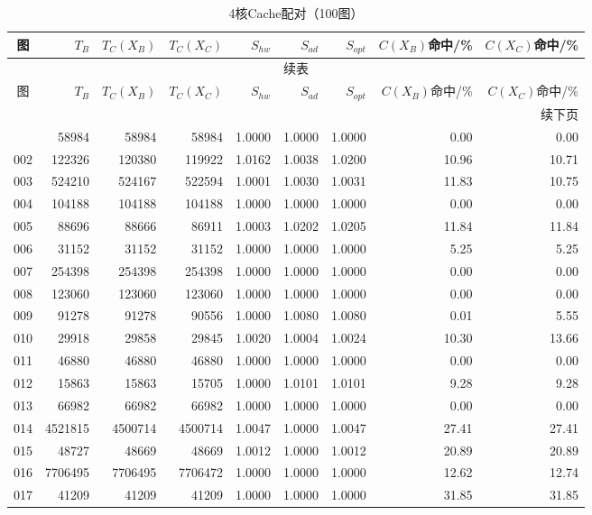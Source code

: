 \begin{longtable}{crrrrrrrr}
\caption{4核Cache配对（100图）}\label{tab:cache-detail-4}\\
\toprule
图 & $T_B$ & $T_C(X_B)$ & $T_C(X_C)$ & $S_{hw}$ & $S_{ad}$ & $S_{opt}$ & $C(X_B)$命中/\% & $C(X_C)$命中/\% \\
\midrule
\endfirsthead
\multicolumn{9}{c}{续表}\\
\toprule
图 & $T_B$ & $T_C(X_B)$ & $T_C(X_C)$ & $S_{hw}$ & $S_{ad}$ & $S_{opt}$ & $C(X_B)$命中/\% & $C(X_C)$命中/\% \\
\midrule
\endhead
\midrule\multicolumn{9}{r}{续下页}\\
\endfoot
\bottomrule
\endlastfoot
001 & 58984 & 58984 & 58984 & 1.0000 & 1.0000 & 1.0000 & 0.00 & 0.00 \\
002 & 122326 & 120380 & 119922 & 1.0162 & 1.0038 & 1.0200 & 10.96 & 10.71 \\
003 & 524210 & 524167 & 522594 & 1.0001 & 1.0030 & 1.0031 & 11.83 & 10.75 \\
004 & 104188 & 104188 & 104188 & 1.0000 & 1.0000 & 1.0000 & 0.00 & 0.00 \\
005 & 88696 & 88666 & 86911 & 1.0003 & 1.0202 & 1.0205 & 11.84 & 11.84 \\
006 & 31152 & 31152 & 31152 & 1.0000 & 1.0000 & 1.0000 & 5.25 & 5.25 \\
007 & 254398 & 254398 & 254398 & 1.0000 & 1.0000 & 1.0000 & 0.00 & 0.00 \\
008 & 123060 & 123060 & 123060 & 1.0000 & 1.0000 & 1.0000 & 0.00 & 0.00 \\
009 & 91278 & 91278 & 90556 & 1.0000 & 1.0080 & 1.0080 & 0.01 & 5.55 \\
010 & 29918 & 29858 & 29845 & 1.0020 & 1.0004 & 1.0024 & 10.30 & 13.66 \\
011 & 46880 & 46880 & 46880 & 1.0000 & 1.0000 & 1.0000 & 0.00 & 0.00 \\
012 & 15863 & 15863 & 15705 & 1.0000 & 1.0101 & 1.0101 & 9.28 & 9.28 \\
013 & 66982 & 66982 & 66982 & 1.0000 & 1.0000 & 1.0000 & 0.00 & 0.00 \\
014 & 4521815 & 4500714 & 4500714 & 1.0047 & 1.0000 & 1.0047 & 27.41 & 27.41 \\
015 & 48727 & 48669 & 48669 & 1.0012 & 1.0000 & 1.0012 & 20.89 & 20.89 \\
016 & 7706495 & 7706495 & 7706472 & 1.0000 & 1.0000 & 1.0000 & 12.62 & 12.74 \\
017 & 41209 & 41209 & 41209 & 1.0000 & 1.0000 & 1.0000 & 31.85 & 31.85 \\

\end{longtable}
